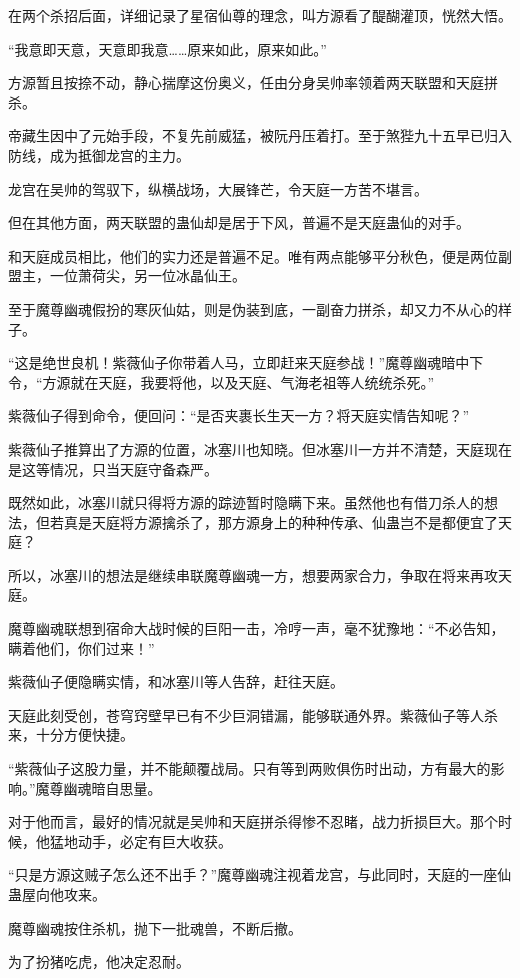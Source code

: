 \begin{this_body}
在两个杀招后面，详细记录了星宿仙尊的理念，叫方源看了醍醐灌顶，恍然大悟。

“我意即天意，天意即我意……原来如此，原来如此。”

方源暂且按捺不动，静心揣摩这份奥义，任由分身吴帅率领着两天联盟和天庭拼杀。

帝藏生因中了元始手段，不复先前威猛，被阮丹压着打。至于煞狴九十五早已归入防线，成为抵御龙宫的主力。

龙宫在吴帅的驾驭下，纵横战场，大展锋芒，令天庭一方苦不堪言。

但在其他方面，两天联盟的蛊仙却是居于下风，普遍不是天庭蛊仙的对手。

和天庭成员相比，他们的实力还是普遍不足。唯有两点能够平分秋色，便是两位副盟主，一位萧荷尖，另一位冰晶仙王。

至于魔尊幽魂假扮的寒灰仙姑，则是伪装到底，一副奋力拼杀，却又力不从心的样子。

“这是绝世良机！紫薇仙子你带着人马，立即赶来天庭参战！”魔尊幽魂暗中下令，“方源就在天庭，我要将他，以及天庭、气海老祖等人统统杀死。”

紫薇仙子得到命令，便回问：“是否夹裹长生天一方？将天庭实情告知呢？”

紫薇仙子推算出了方源的位置，冰塞川也知晓。但冰塞川一方并不清楚，天庭现在是这等情况，只当天庭守备森严。

既然如此，冰塞川就只得将方源的踪迹暂时隐瞒下来。虽然他也有借刀杀人的想法，但若真是天庭将方源擒杀了，那方源身上的种种传承、仙蛊岂不是都便宜了天庭？

所以，冰塞川的想法是继续串联魔尊幽魂一方，想要两家合力，争取在将来再攻天庭。

魔尊幽魂联想到宿命大战时候的巨阳一击，冷哼一声，毫不犹豫地：“不必告知，瞒着他们，你们过来！”

紫薇仙子便隐瞒实情，和冰塞川等人告辞，赶往天庭。

天庭此刻受创，苍穹窍壁早已有不少巨洞错漏，能够联通外界。紫薇仙子等人杀来，十分方便快捷。

“紫薇仙子这股力量，并不能颠覆战局。只有等到两败俱伤时出动，方有最大的影响。”魔尊幽魂暗自思量。

对于他而言，最好的情况就是吴帅和天庭拼杀得惨不忍睹，战力折损巨大。那个时候，他猛地动手，必定有巨大收获。

“只是方源这贼子怎么还不出手？”魔尊幽魂注视着龙宫，与此同时，天庭的一座仙蛊屋向他攻来。

魔尊幽魂按住杀机，抛下一批魂兽，不断后撤。

为了扮猪吃虎，他决定忍耐。


\end{this_body}
